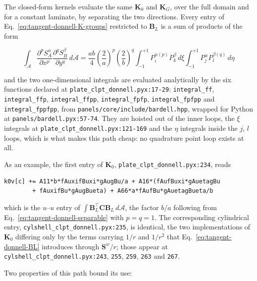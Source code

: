The closed-form kernels evaluate the same $\boldsymbol{K}_0$ and $\boldsymbol{K}_G$, over the full domain and for a constant laminate, by separating the two directions. Every entry of Eq.~\ref{eq:tangent-donnell-K-groups} restricted to $\boldsymbol{B}_L$ is a sum of products of the form

\begin{equation}\label{eq:tangent-donnell-separable}
	\int_{\mathcal{A}} \frac{\partial^{p} S^{\alpha}_A}{\partial x^{p}} \frac{\partial^{q} S^{\beta}_B}{\partial y^{q}} \, d\mathcal{A}
	= \frac{ab}{4} \left( \frac{2}{a} \right)^{p} \left( \frac{2}{b} \right)^{q}
	\int_{-1}^{+1} P_i^{\alpha (p)} P_k^{\beta} \, d\xi \int_{-1}^{+1} P_j^{\alpha} P_l^{\beta (q)} \, d\eta
\end{equation}

\noindent and the two one-dimensional integrals are evaluated analytically by the six functions declared at \texttt{plate\_clpt\_donnell.pyx:17-29}: \texttt{integral\_ff}, \texttt{integral\_ffp}, \texttt{integral\_ffpp}, \texttt{integral\_fpfp}, \texttt{integral\_fpfpp} and \texttt{integral\_fppfpp}, from \texttt{panels/core/include/bardell.hpp}, wrapped for Python at \texttt{panels/bardell.pyx:57-74}. They are hoisted out of the inner loops, the $\xi$ integrals at \texttt{plate\_clpt\_donnell.pyx:121-169} and the $\eta$ integrals inside the $j$, $l$ loops, which is what makes this path cheap: no quadrature point loop exists at all.

As an example, the first entry of $\boldsymbol{K}_0$, \texttt{plate\_clpt\_donnell.pyx:234}, reads

\begin{verbatim}
k0v[c] += A11*b*fAuxifBuxi*gAugBu/a + A16*(fAufBuxi*gAuetagBu
        + fAuxifBu*gAugBueta) + A66*a*fAufBu*gAuetagBueta/b
\end{verbatim}

\noindent which is the $u$--$u$ entry of $\int \boldsymbol{B}_L^\top \boldsymbol{C} \boldsymbol{B}_L \, d\mathcal{A}$, the factor $b/a$ following from Eq.~\ref{eq:tangent-donnell-separable} with $p = q = 1$. The corresponding cylindrical entry, \texttt{cylshell\_clpt\_donnell.pyx:235}, is identical, the two implementations of $\boldsymbol{K}_0$ differing only by the terms carrying $1/r$ and $1/r^2$ that Eq.~\ref{eq:tangent-donnell-BL} introduces through $\boldsymbol{S}^w/r$; those appear at \texttt{cylshell\_clpt\_donnell.pyx:243}, \texttt{255}, \texttt{259}, \texttt{263} and \texttt{267}.

Two properties of this path bound its use:

